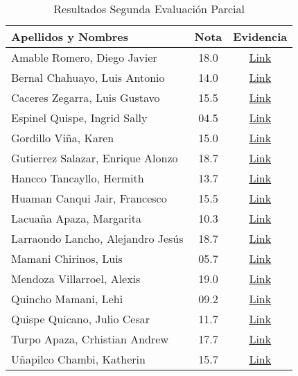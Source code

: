 \begin{table}[h]
\centering
\begin{tabular}{l|c|c}
\hline
\textbf{Apellidos y Nombres} & 
\textbf{Nota} & 
\textbf{Evidencia} 
\\ \hline
Amable Romero, Diego Javier &
18.0 &
\href{https://drive.google.com/open?id=1pMWVNwmbCAlMKkkZ20HA2tJ4Cz9KOybp}{Link}
\\ \hline
Bernal Chahuayo, Luis Antonio &
14.0 &
\href{https://drive.google.com/open?id=177e8FGFaXUCIT2CRNO_i-DiU06sjkQH7}{Link}
\\ \hline
Caceres Zegarra, Luis Gustavo &
15.5 &
\href{https://drive.google.com/open?id=1eVcAY1rwdjbxuOwQviGR0tYqKSX-VrGD}{Link}
\\ \hline
Espinel Quispe, Ingrid Sally &
04.5 &
\href{https://drive.google.com/open?id=1tdDHdv3b46FVcuoXfkDbHvityP70oWh7}{Link} 
\\ \hline
Gordillo Viña, Karen &
15.0 &
\href{https://drive.google.com/open?id=1ecqq7fwLKZL_8FLpzCGptllY4I3oc1so}{Link}
\\ \hline
Gutierrez Salazar, Enrique Alonzo &
18.7 &
\href{https://drive.google.com/open?id=1qV4qk05ky-xGPGJethajAdj1_zb7YUtA}{Link}
\\ \hline
Hancco Tancayllo, Hermith &
13.7 &
\href{https://drive.google.com/open?id=1_YK49t-_ge6nm_LrBNI-0m6FXANRIxAt}{Link}
\\ \hline
Huaman Canqui Jair, Francesco &
15.5 &
\href{https://drive.google.com/open?id=1-OCEerOcv43sP_aU34rc4MLzQVfceVqZ}{Link}
\\ \hline
Lacuaña Apaza, Margarita &
10.3 &
\href{https://drive.google.com/open?id=1tQUwWS700bsLdf5w4zHMgHvI45HGMaNF}{Link}
\\ \hline
Larraondo Lancho, Alejandro Jesús &
18.7 &
\href{https://drive.google.com/open?id=1gHoNNeh1olKAMd4VEmBgero5vv3do5KI}{Link}
\\ \hline
Mamani Chirinos, Luis &
05.7 &
\href{https://drive.google.com/open?id=1HS19DQegS3izRw6_yOG-zwSM13TGqBIq}{Link}
\\ \hline
Mendoza Villarroel, Alexis &
19.0 &
\href{https://drive.google.com/open?id=1V_T9FFp58mzFjYLbZTlKu7S_lvrgFJe1}{Link}
\\ \hline
Quincho Mamani, Lehi &
09.2 &
\href{https://drive.google.com/open?id=1c6taLWJSFkWHZmj0zQziyrWUinz3-A8m}{Link}
\\ \hline
Quispe Quicano, Julio Cesar &
11.7 &
\href{https://drive.google.com/open?id=1BapaIzxoX-3Nd3rEekwmFkYuOK9pmUPo}{Link}
\\ \hline
Turpo Apaza, Crhistian Andrew &
17.7 &
\href{https://drive.google.com/open?id=1Fg3SU_YOXJaY4Mqb28qrCIKOdIdZHix4}{Link}
\\ \hline
Uñapilco Chambi, Katherin &
15.7 &
\href{https://drive.google.com/open?id=16Cp0sT3WmDwVarLYgWCnLJX9JISUqpoc}{Link}
\\ \hline
\end{tabular}
\caption{Resultados Segunda Evaluación Parcial}
\label{tab:evalucion_parcial_2} %
\end{table}
